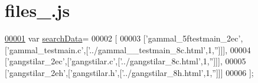 \hypertarget{files__1_8js_source}{}\section{files\+\_.\+js}
\label{files__1_8js_source}

\begin{DoxyCode}
\hypertarget{files__1_8js_source.tex_l00001}{}\hyperlink{files__1_8js_ad01a7523f103d6242ef9b0451861231e}{00001} var \hyperlink{files__1_8js_ad01a7523f103d6242ef9b0451861231e}{searchData}=
00002 [
00003   [\textcolor{stringliteral}{'gammal\_5ftestmain\_2ec'},[\textcolor{stringliteral}{'gammal\_testmain.c'},[\textcolor{stringliteral}{'../gammal\_\_testmain\_8c.html'},1,\textcolor{stringliteral}{''}]]],
00004   [\textcolor{stringliteral}{'gangstilar\_2ec'},[\textcolor{stringliteral}{'gangstilar.c'},[\textcolor{stringliteral}{'../gangstilar\_8c.html'},1,\textcolor{stringliteral}{''}]]],
00005   [\textcolor{stringliteral}{'gangstilar\_2eh'},[\textcolor{stringliteral}{'gangstilar.h'},[\textcolor{stringliteral}{'../gangstilar\_8h.html'},1,\textcolor{stringliteral}{''}]]]
00006 ];
\end{DoxyCode}
